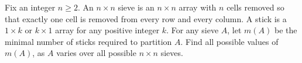 Fix an integer $n \geq 2$. An $n\times n$ sieve is an $n\times n$ array with $n$ cells removed so that exactly one cell is removed from every row and every column. A stick is a $1\times k$ or $k\times 1$ array for any positive integer $k$. For any sieve $A$, let $m(A)$ be the minimal number of sticks required to partition $A$. Find all possible values of $m(A)$, as $A$ varies over all possible $n\times n$ sieves. 
